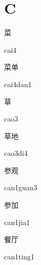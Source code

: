 ﻿%
\section*{C}

\begin{verbete}[cai4]{菜}
\begin{pronuncia}{cai4}
\end{pronuncia}
\end{verbete}

\begin{verbete}{菜单}
\begin{pronuncia}{cai4dan1}
\end{pronuncia}
\end{verbete}

\begin{verbete}[cao3]{草}
\begin{pronuncia}{cao3}
\end{pronuncia}
\end{verbete}

\begin{verbete}[cao3di4]{草地}
\begin{pronuncia}{cao3di4}
\end{pronuncia}
\end{verbete}

\begin{verbete}{参观}
\begin{pronuncia}{can1guan3}
\end{pronuncia}
\end{verbete}

\begin{verbete}{参加}
\begin{pronuncia}{can1jia1}
\end{pronuncia}
\end{verbete}

\begin{verbete}{餐厅}
\begin{pronuncia}{can1ting1}
\end{pronuncia}
\end{verbete}

